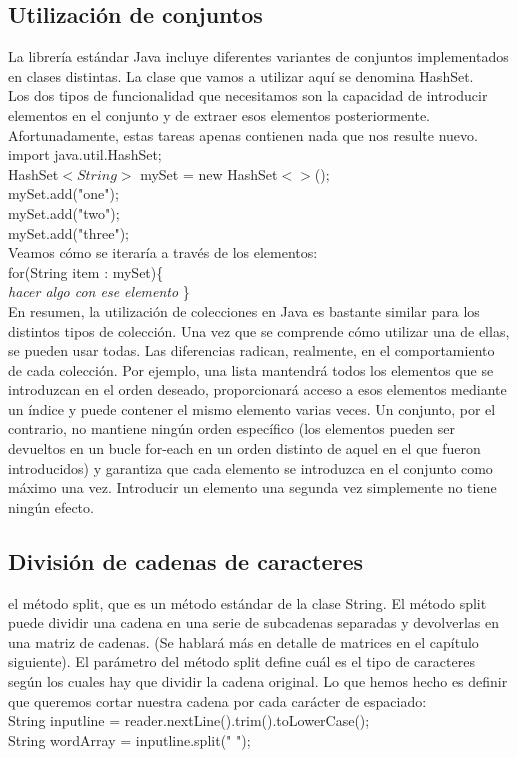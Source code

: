 \documentclass[11pt,a4paper]{article}
\begin{document}
	\subsection{Utilización de conjuntos}
	La librería estándar Java incluye diferentes variantes de conjuntos implementados en clases distintas.
	La clase que vamos a utilizar aquí se denomina HashSet.\\
	Los dos tipos de funcionalidad que necesitamos son la capacidad de introducir elementos en el
	conjunto y de extraer esos elementos posteriormente. Afortunadamente, estas tareas apenas contienen
	nada que nos resulte nuevo.\\
	import java.util.HashSet;\\
	HashSet$<String>$ mySet = new HashSet$<>$();
	\\
	mySet.add("one");\\
	mySet.add("two");\\
	mySet.add("three");
	\\
	Veamos cómo se iteraría a través de los elementos:\\
	for(String item : mySet)\{ \\
	\textit{hacer algo con ese elemento}
	\}\\
	En resumen, la utilización de colecciones en Java es bastante similar para los distintos tipos de
	colección. Una vez que se comprende cómo utilizar una de ellas, se pueden usar todas. Las diferencias
	radican, realmente, en el comportamiento de cada colección. Por ejemplo, una lista mantendrá
	todos los elementos que se introduzcan en el orden deseado, proporcionará acceso a esos
	elementos mediante un índice y puede contener el mismo elemento varias veces. Un conjunto,
	por el contrario, no mantiene ningún orden específico (los elementos pueden ser devueltos en un
	bucle for-each en un orden distinto de aquel en el que fueron introducidos) y garantiza que cada
	elemento se introduzca en el conjunto como máximo una vez. Introducir un elemento una segunda
	vez simplemente no tiene ningún efecto.
	\subsection{División de cadenas de caracteres}
	el método split, que es un método estándar
	de la clase String.
	El método split puede dividir una cadena en una serie de subcadenas separadas y devolverlas en
	una matriz de cadenas. (Se hablará más en detalle de matrices en el capítulo siguiente). El parámetro
	del método split define cuál es el tipo de caracteres según los cuales hay que dividir la cadena
	original. Lo que hemos hecho es definir que queremos cortar nuestra cadena por cada carácter de
	espaciado:
	\\
	String inputline = reader.nextLine().trim().toLowerCase();\\
	 String wordArray = inputline.split(" ");
\end{document}

